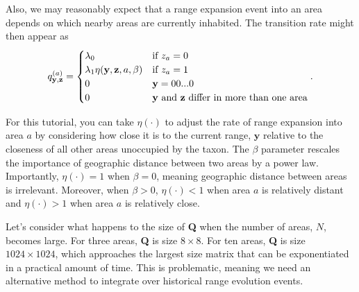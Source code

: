 \documentclass[11pt]{article}
\begin{document}
%

Also, we may reasonably expect that a range expansion event into an area depends on which nearby areas are currently inhabited.
The transition rate might then appear as
\[
q^{(a)}_{\textbf{y},\textbf{z}} =
\begin{cases}
\lambda_0 & \text{if $z_a=0$}  \\
\lambda_1 \eta(\textbf{y}, \textbf{z}, a, \beta) & \text{if $z_a=1$} \\
0 & \mathbf{y} = 00...0 \\
0 & \text{\textbf{y} and \textbf{z} differ in more than one area}
\end{cases}.
\]

For this tutorial, you can take $\eta(\cdot)$ to adjust the rate of range expansion into area $a$ by considering how close it is to the current range, $\textbf{y}$ relative to the closeness of all other areas unoccupied by the taxon.
The $\beta$ parameter rescales the importance of geographic distance between two areas by a power law.
Importantly, $\eta(\cdot) = 1$ when $\beta=0$, meaning geographic distance between areas is irrelevant.
Moreover, when $\beta > 0$, $\eta(\cdot) < 1$ when area $a$ is relatively distant and $\eta(\cdot) > 1$ when area $a$ is relatively close.

Let's consider what happens to the size of \textbf{Q} when the number of areas, $N$, becomes large.
For three areas, \textbf{Q} is size $8 \times 8$.
For ten areas, \textbf{Q} is size $1024 \times 1024$, which approaches the largest size matrix that can be exponentiated in a practical amount of time.
This is problematic, meaning we need an alternative method to integrate over historical range evolution events.
\end{document}
